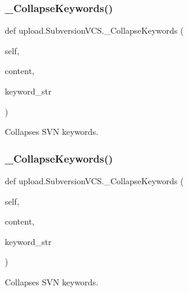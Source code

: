 \subsubsection{\texorpdfstring{\_CollapseKeywords()}{\_CollapseKeywords()}\hspace{0.1cm}{\footnotesize\ttfamily [1/2]}}
{\footnotesize\ttfamily def upload.\+Subversion\+V\+C\+S.\+\_\+\+Collapse\+Keywords (\begin{DoxyParamCaption}\item[{}]{self,  }\item[{}]{content,  }\item[{}]{keyword\+\_\+str }\end{DoxyParamCaption})\hspace{0.3cm}{\ttfamily [private]}}

\begin{DoxyVerb}Collapses SVN keywords.\end{DoxyVerb}
 \mbox{\label{classupload_1_1_subversion_v_c_s_ab484ddd61e217927fb61639bacdbb68d}} 
\subsubsection{\texorpdfstring{\_CollapseKeywords()}{\_CollapseKeywords()}\hspace{0.1cm}{\footnotesize\ttfamily [2/2]}}
{\footnotesize\ttfamily def upload.\+Subversion\+V\+C\+S.\+\_\+\+Collapse\+Keywords (\begin{DoxyParamCaption}\item[{}]{self,  }\item[{}]{content,  }\item[{}]{keyword\+\_\+str }\end{DoxyParamCaption})\hspace{0.3cm}{\ttfamily [private]}}

\begin{DoxyVerb}Collapses SVN keywords.\end{DoxyVerb}
 \mbox{\label{classupload_1_1_subversion_v_c_s_ad257205675d7d9d291145f4aa405964b}} 

